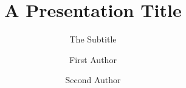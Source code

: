 \documentclass{beamer}
\title{A Presentation Title}
\subtitle{The Subtitle}
\author{First Author \and Second Author}
\institute{Some Institute}
\begin{document}
\begin{frame}
\titlepage
\end{frame}
\end{document}
